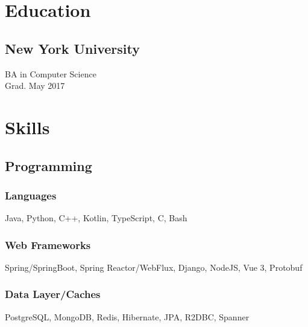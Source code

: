 \documentclass[]{two-column-resume}
\begin{document}
\begin{minipage}[t]{0.34\textwidth}

%
\section{Education}

\subsection{New York University}
BA in Computer Science \\
Grad. May 2017 \\


    \sectionsep

%
\section{Skills}
\setlength{\parindent}{3ex}
\subsection{Programming}

    \subsubsection{Languages}
            Java, 
            Python, 
            C++, 
            Kotlin, 
            TypeScript, 
            C, 
            Bash
        \newline
    \subsubsection{Web Frameworks}
            Spring/SpringBoot, 
            Spring Reactor/WebFlux, 
            Django, 
            NodeJS, 
            Vue 3, 
            Protobuf
        \newline
    \subsubsection{Data Layer/Caches}
            PostgreSQL, 
            MongoDB, 
            Redis, 
            Hibernate, 
            JPA, 
            R2DBC, 
            Spanner
        \newline

\end{minipage}
\end{document}
